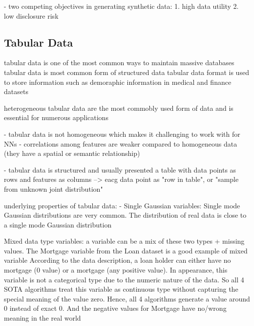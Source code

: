 
- two competing objectives in generating synthetic data: \cite{little2021GenerativeAdversarialNetworksa}
    1. high data utility \cite{little2021GenerativeAdversarialNetworksa}
    2. low disclosure risk \cite{little2021GenerativeAdversarialNetworksa}


\subsection{Tabular Data}
\label{ch:preliminaries-dataSynthesis-tabularData}


tabular data is one of the most common ways to maintain massive databases \cite{esmaeilpour2022BidiscriminatorGANTabular} \cite{yoon2020VIMEExtendingSuccess}
tabular data is most common form of structured data \cite{hernandez2022SyntheticDataGeneration}
tabular data format is used to store information such as demoraphic information in medical and finance datasets \cite{yoon2020VIMEExtendingSuccess}

heterogeneous tabular data are the most commobly used form of data and is essential for numerous applications \cite{borisov2022DeepNeuralNetworks}


- tabular data is not homogeneous which makes it challenging to work with for NNs \cite{borisov2022DeepNeuralNetworks}
- correlations among features are weaker compared to homogeneous data (they have a spatial or semantic relationship) \cite{borisov2022DeepNeuralNetworks} \cite{yoon2020VIMEExtendingSuccess} %

- tabular data is structured and usually presented a table with data points as rows and features as columns \cite{borisov2022DeepNeuralNetworks} \cite{yoon2020VIMEExtendingSuccess}
--> eacg data point as "row in table", or "sample from unknown joint distribution"

underlying properties of tabular data: \cite{zhao2022CTABGANEnhancingTabular}
- Single Gaussian variables:
    Single mode Gaussian distributions are very common.
    The distribution of real data is close to a single mode Gaussian distribution

Mixed data type variables:\cite{zhao2022CTABGANEnhancingTabular}
    a variable can be a mix of these two types + missing values. The Mortgage variable from the Loan dataset is a good example of mixed variable
    According to the data description, a loan holder can either have no mortgage (0 value) or a mortgage (any positive value). 
    In appearance, this variable is not a categorical type due to the numeric nature of the data. 
    So all 4 SOTA algorithms treat this variable as continuous type without capturing the special meaning of the value zero. 
    Hence, all 4 algorithms generate a value around 0 instead of exact 0. And the negative values for Mortgage have no/wrong meaning in the real world

